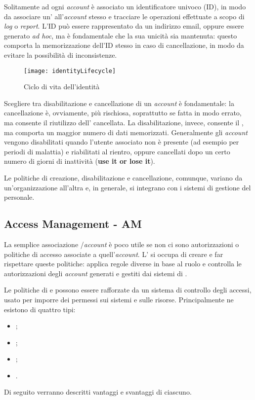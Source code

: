 Solitamente ad ogni \textit{account} è associato un identificatore univoco (ID), in modo da associare un' all'\textit{account} stesso e tracciare le operazioni effettuate a scopo di \textit{log} o \textit{report}. L'ID può essere rappresentato da un indirizzo email, oppure essere generato \textit{ad hoc}, ma è fondamentale che la sua unicità sia mantenuta: questo comporta la memorizzazione dell'ID stesso in caso di cancellazione, in modo da evitare la possibilità di inconsistenze.

\begin{figure}[hbpc]
\begin{center}
\texttt{[image: identityLifecycle]}
\caption[Ciclo di vita dell'identità]{Ciclo di vita dell'identità\protect\footnotemark}
\label{fig:identitylifecicle}
\end{center}
\end{figure}

Scegliere tra disabilitazione e cancellazione di un \textit{account} è fondamentale: la cancellazione è, ovviamente, più rischiosa, soprattutto se fatta in modo errato, ma consente il riutilizzo dell' cancellata. La disabilitazione, invece, consente il , ma comporta un maggior numero di dati memorizzati. Generalmente gli \textit{account} vengono disabilitati quando l'utente associato non è presente (ad esempio per periodi di malattia) e riabilitati al rientro, oppure cancellati dopo un certo numero di giorni di inattività (\textbf{use it or lose it}). 

Le politiche di creazione, disabilitazione e cancellazione, comunque, variano da un'organizzazione all'altra e, in generale, si integrano con i sistemi di gestione del personale.

\subsection{Access Management - AM}
La semplice associazione /\textit{account} è poco utile se non ci sono autorizzazioni o politiche di accesso associate a quell'\textit{account}. L' si occupa di creare e far rispettare queste politiche: applica regole diverse in base al ruolo e controlla le autorizzazioni degli \textit{account} generati e gestiti dai sistemi di . 

Le politiche di  e  possono essere rafforzate da un sistema di controllo degli accessi, usato per imporre dei permessi sui sistemi e sulle risorse. Principalmente ne esistono di quattro tipi:
\begin{itemize}
\item {};
\item {};
\item {};
\item {}.
\end{itemize}
Di seguito verranno descritti vantaggi e svantaggi di ciascuno.

